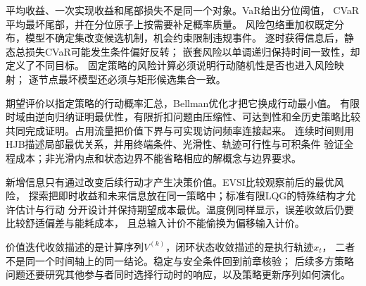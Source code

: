 平均收益、一次实现收益和尾部损失不是同一个对象。VaR给出分位阈值，
CVaR平均最坏尾部，并在分位原子上按需要补足概率质量。
风险包络重加权既定分布，模型不确定集改变候选机制，机会约束限制违规事件。
逐时获得信息后，静态总损失CVaR可能发生条件偏好反转；
嵌套风险以单调递归保持时间一致性，却定义了不同目标。
固定策略的风险计算必须说明行动随机性是否也进入风险映射；
逐节点最坏模型还必须与矩形候选集合一致。

期望评价以指定策略的行动概率汇总，Bellman优化才把它换成行动最小值。
有限时域由逆向归纳证明最优性，有限折扣问题由压缩性、可达到性和全历史策略比较
共同完成证明。占用流量把价值下界与可实现访问频率连接起来。
连续时间则用HJB描述局部最优关系，并用终端条件、光滑性、轨迹可行性与可积条件
验证全程成本；非光滑内点和状态边界不能省略相应的解概念与边界要求。

新增信息只有通过改变后续行动才产生决策价值。EVSI比较观察前后的最优风险，
探索把即时收益和未来信息放在同一策略中；标准有限LQG的特殊结构才允许估计与行动
分开设计并保持期望成本最优。温度例同样显示，误差收敛后仍要比较舒适偏差与能耗成本，
且总输入计价不能偷换为偏移输入计价。

价值迭代收敛描述的是计算序列$V^{(k)}$，闭环状态收敛描述的是执行轨迹$x_t$，
二者不是同一个时间轴上的同一结论。稳定与安全条件回到前章核验；
后续多方策略问题还要研究其他参与者同时选择行动时的响应，以及策略更新序列如何演化。
